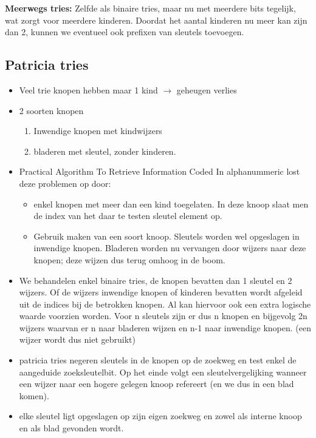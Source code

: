\begin{mdframed}[leftmargin=10pt,rightmargin=10pt]
\textbf{Meerwegs tries:} Zelfde als binaire tries, maar nu met meerdere bits tegelijk, wat zorgt voor meerdere kinderen. Doordat het aantal kinderen nu meer kan zijn dan 2, kunnen we eventueel ook prefixen van sleutels toevoegen.
\end{mdframed}
\clearpage
\subsection{Patricia tries}
\begin{itemize}
\item Veel trie knopen hebben maar 1 kind $\rightarrow$ geheugen verlies
\item 2 soorten knopen 
\begin{enumerate}
\item Inwendige knopen met kindwijzers
\item bladeren met sleutel, zonder kinderen.
\end{enumerate}
\item Practical Algorithm To Retrieve Information Coded In alphanummeric lost deze problemen op door:
\begin{itemize}
\item enkel knopen met meer dan een kind toegelaten. In deze knoop slaat men de index van het daar te testen sleutel element op.
\item Gebruik maken van een soort knoop. Sleutels worden wel opgeslagen in inwendige knopen. Bladeren worden nu vervangen door wijzers naar deze knopen; deze wijzen dus terug omhoog in de boom.
\end{itemize}
\clearpage
\item We behandelen enkel binaire tries, de knopen bevatten dan 1 sleutel en 2 wijzers. Of de wijzers inwendige knopen of kinderen bevatten wordt afgeleid uit de indices bij de betrokken knopen. Al kan hiervoor ook een extra logische waarde voorzien worden. Voor n sleutels zijn er dus n knopen en bijgevolg 2n wijzers waarvan er n naar bladeren wijzen en n-1 naar inwendige knopen. (een wijzer wordt dus niet gebruikt)
\item patricia tries negeren sleutels in de knopen op de zoekweg en test enkel de aangeduide zoeksleutelbit. Op het einde volgt een sleutelvergelijking wanneer een wijzer naar een hogere gelegen knoop refereert (en we dus in een blad komen).
\item elke sleutel ligt opgeslagen op zijn eigen zoekweg en zowel als interne knoop en als blad gevonden wordt.

\end{itemize}
